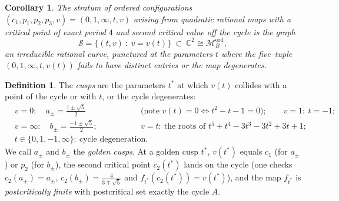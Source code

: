 \documentclass[11pt]{amsart}
\theoremstyle{plain}
\newtheorem{corollary}[theorem]{Corollary}
\theoremstyle{definition}
\newtheorem{definition}[theorem]{Definition}
\newcommand{\C}{\mathbb{C}}
\newcommand{\M}{\mathcal{M}}
\newcommand{\S}{\mathcal{S}}
\begin{document}
\begin{corollary}\label{cor:stratumcurve}
The stratum of ordered configurations
$(c_1,p_1,p_2,p_3,v)=(0,1,\infty,t,v)$ arising from quadratic rational
maps with a critical point of exact period $4$ and second critical value off
the cycle is the graph
$$\S=\{(t,v)\ :\ v=v(t)\}\ \subset\ \C^2\cong\M_B^{\mathrm{ord}},$$
an irreducible rational curve, punctured at the parameters $t$ where the
five--tuple $(0,1,\infty,t,v(t))$ fails to have distinct entries or the map
degenerates.
\end{corollary}

\begin{definition}\label{def:cusps}
The \emph{cusps} are the parameters $t^{*}$ at which $v(t)$ collides with a
point of the cycle or with $t$, or the cycle degenerates:
\begin{align*}
&v=0:\quad a_\pm=\tfrac{1\pm\sqrt5}{2} &&\text{(note }v(t)=0\iff
t^2-t-1=0);\qquad
v=1:\ t=-1;\\
&v=\infty:\quad b_\pm=\tfrac{-1\pm\sqrt5}{2};\qquad &&
v=t:\ \text{the roots of } t^{5}+t^{4}-3t^{3}-3t^{2}+3t+1;\\
&t\in\{0,1,-1,\infty\}:\ \text{cycle degeneration}.
\end{align*}
We call $a_\pm$ and $b_\pm$ the \emph{golden cusps}.  At a golden cusp
$t^{*}$, $v(t^{*})$ equals $c_1$ (for $a_\pm$) or $p_2$ (for $b_\pm$), the
second critical point $c_2(t^{*})$ lands on the cycle
(one checks $c_2(a_\pm)=a_\pm$, $c_2(b_\pm)=\frac{4}{3\mp\sqrt5}$ and
$f_{t^{*}}(c_2(t^{*}))=v(t^{*})$), and the map $f_{t^{*}}$ is
\emph{postcritically finite} with postcritical set exactly the cycle $A$.
\end{definition}
\end{document}
